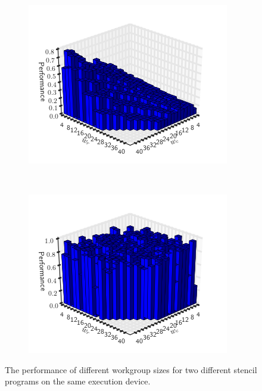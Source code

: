 \documentclass[nonatbib,preprint,9pt]{sigplanconf}
\begin{document}
\begin{figure}
\centering
\begin{subfigure}[h]{.45\columnwidth}
\centering
\includegraphics[width=1.0\columnwidth]{img/motivation_3}
\vspace{-1.5em} %
\caption{}
\label{fig:motivation-3}
\end{subfigure}
~%
\begin{subfigure}[h]{.45\columnwidth}
\centering
\includegraphics[width=1.0\columnwidth]{img/motivation_4}
\vspace{-1.5em} %
\caption{}
\label{fig:motivation-4}
\end{subfigure}
\caption{%
  The performance of different workgroup sizes for two different
  stencil programs on the same execution device.%
}
\label{fig:motivation-prog}
\end{figure}
\end{document}
